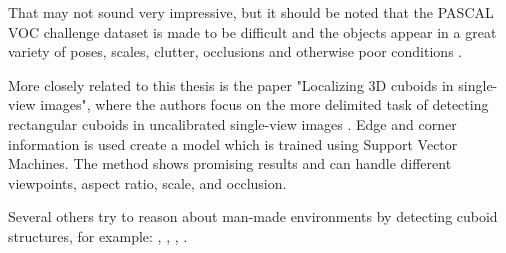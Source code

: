 That may not sound very impressive, but it should be noted that the PASCAL VOC challenge dataset is made to be difficult and the objects appear in a great variety of poses, scales, clutter, occlusions and otherwise poor conditions \cite{everingham2010pascal}.


More closely related to this thesis is the paper "Localizing 3D cuboids in single-view images", where the authors focus on the more delimited task of detecting rectangular cuboids in uncalibrated single-view images \cite{xiaolocalizing}.
Edge and corner information is used create a model which is trained using Support Vector Machines.
The method shows promising results and can handle different viewpoints, aspect ratio, scale, and occlusion.

Several others try to reason about man-made environments by detecting cuboid structures, for example: \cite{hedau2010thinking}, \cite{hedau2012recovering}, \cite{gupta2010estimating}, \cite{del2012bayesian}.
